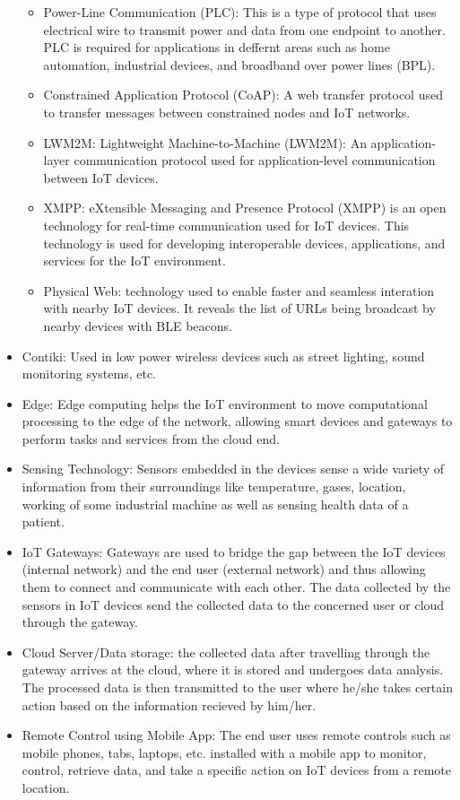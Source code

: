 \begin{itemize}
\begin{itemize}
        \item Power-Line Communication (PLC): This is a type of protocol that uses electrical wire to transmit power and data from one endpoint to another. PLC is required for applications in deffernt areas such as home automation, industrial devices, and broadband over power lines (BPL).
        \item Constrained Application Protocol (CoAP): A web transfer protocol used to transfer messages between constrained nodes and IoT networks.
        \item LWM2M: Lightweight Machine-to-Machine (LWM2M): An application-layer communication protocol used for application-level communication between IoT devices.
        \item XMPP: eXtensible Messaging and Presence Protocol (XMPP) is an open technology for real-time communication used for IoT devices. This technology is used for developing interoperable devices, applications, and services for the IoT environment.
        \item Physical Web: technology used to enable faster and seamless interation with nearby IoT devices. It reveals the list of URLs being broadcast by nearby devices with BLE beacons.
    \end{itemize}
    \item Contiki: Used in low power wireless devices such as street lighting, sound monitoring systems, etc.
    \item Edge: Edge computing helps the IoT environment to move computational processing to the edge of the network, allowing smart devices and gateways to perform tasks and services from the cloud end.
    \item Sensing Technology: Sensors embedded in the devices sense a wide variety of information from their surroundings like temperature, gases, location, working of some industrial machine as well as sensing health data of a patient.
    \item IoT Gateways: Gateways are used to bridge the gap between the IoT devices (internal network) and the end user (external network) and thus allowing them to connect and communicate with each other. The data collected by the sensors in IoT devices send the collected data to the concerned user or cloud through the gateway.
    \item Cloud Server/Data storage: the collected data after travelling through the gateway arrives at the cloud, where it is stored and undergoes data analysis. The processed data is then transmitted to the user where he/she takes certain action based on the information recieved by him/her.
    \item Remote Control using Mobile App: The end user uses remote controls such as mobile phones, tabs, laptops, etc. installed with a mobile app to monitor, control, retrieve data, and take a specific action on IoT devices from a remote location.
\end{itemize}
